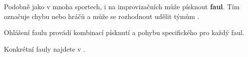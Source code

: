 \needspace{5cm} \label{faul} Podobně jako v mnoha sportech, i na improvizačních  může  písknout \textbf{faul}{}. Tím označuje chybu  nebo hráčů a může se rozhodnout udělit týmům . 
 
Ohlášení faulu provádí  kombinací písknutí a pohybu specifického pro každý faul. 
 
Konkrétní fauly najdete v . 
 
 
